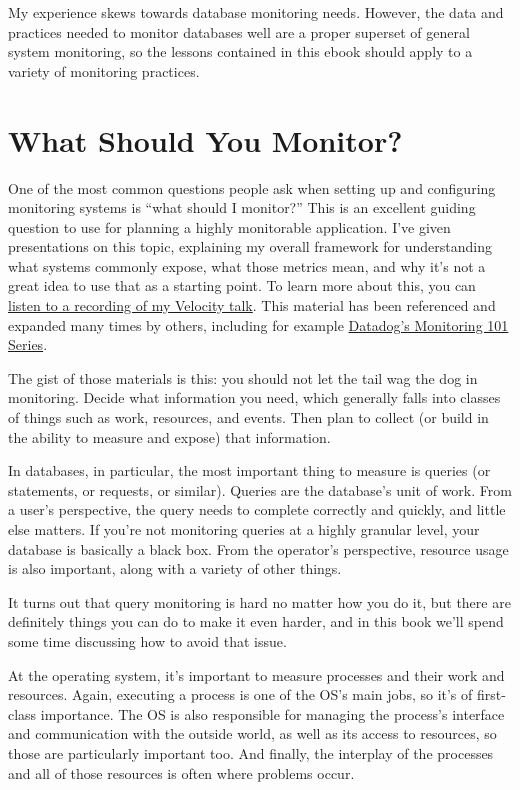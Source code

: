 \documentclass{vivid_layout}
\begin{document}
My experience skews towards database
monitoring needs. However, the data and practices needed to monitor databases
well are a proper superset of general system monitoring, so the lessons
contained in this ebook should apply to a variety of monitoring practices.

\newpage

\section{What Should You Monitor?}

One of the most common questions people ask when setting up and configuring
monitoring systems is ``what should I monitor?'' This is an excellent guiding
question to use for planning a highly monitorable application. I've given
presentations on this topic, explaining my overall framework for understanding
what systems commonly expose, what those metrics mean, and why it's not a great
idea to use that as a starting point. To learn more about this, you can
\href{https://www.youtube.com/watch?v=zLjhFrUhqxg}{listen to a recording of my
Velocity talk}. This material has been referenced and expanded many times by
others, including for example
\href{https://www.datadoghq.com/blog/monitoring-101-collecting-data/}{Datadog's
Monitoring 101 Series}.

The gist of those materials is this: you should not let the tail wag the dog in
monitoring. Decide what information you need, which generally falls into classes
of things such as work, resources, and events. Then plan to collect (or build
in the ability to measure and expose) that information.

In databases, in particular, the most important thing to measure is queries (or
statements, or requests, or similar).  Queries are the database's unit of work.
From a user's perspective, the query needs to complete correctly and quickly,
and little else matters.  If you're not monitoring queries at a highly granular
level, your database is basically a black box.  From the operator's perspective,
resource usage is also important, along with a variety of other things.

It turns out that query monitoring is hard no matter how you do it, but there
are definitely things you can do to make it even harder, and in this book we'll
spend some time discussing how to avoid that issue.

At the operating system, it's important to measure processes and their work and
resources. Again, executing a process is one of the OS's main jobs, so it's
of first-class importance. The OS is also responsible for managing the process's
interface and communication with the outside world, as well as its access to
resources, so those are particularly important too. And finally, the interplay
of the processes and all of those resources is often where problems occur.
\end{document}
